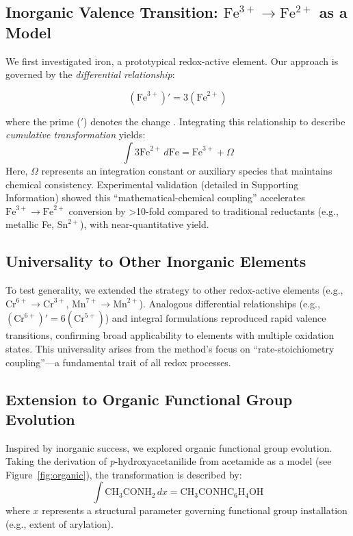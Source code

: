 \documentclass[twocolumn,11pt]{article}
\begin{document}
\subsection{Inorganic Valence Transition: \(\text{Fe}^{3+} \to \text{Fe}^{2+}\) as a Model}
We first investigated iron, a prototypical redox-active element. Our approach is governed by the \emph{differential relationship}:

\begin{equation}
\left( \text{Fe}^{3+} \right)' = 3 \left( \text{Fe}^{2+} \right) 
\end{equation}

where the prime (\('\)) denotes the change . Integrating this relationship to describe \emph{cumulative transformation} yields:
\begin{equation}
\int 3 \text{Fe}^{2+} \, d\text{Fe} = \text{Fe}^{3+} + \Omega
\end{equation}
Here, \(\Omega\) represents an integration constant or auxiliary species that maintains chemical consistency. Experimental validation (detailed in Supporting Information) showed this ``mathematical-chemical coupling'' accelerates \(\text{Fe}^{3+} \to \text{Fe}^{2+}\) conversion by >10-fold compared to traditional reductants (e.g., metallic Fe, \(\text{Sn}^{2+}\)), with near-quantitative yield.

\subsection{Universality to Other Inorganic Elements}
To test generality, we extended the strategy to other redox-active elements (e.g., \(\text{Cr}^{6+} \to \text{Cr}^{3+}\), \(\text{Mn}^{7+} \to \text{Mn}^{2+}\)). Analogous differential relationships (e.g., \(\left( \text{Cr}^{6+} \right)' = 6 \left( \text{Cr}^{5+} \right)\)) and integral formulations reproduced rapid valence transitions, confirming broad applicability to elements with multiple oxidation states. This universality arises from the method’s focus on ``rate-stoichiometry coupling''—a fundamental trait of all redox processes.

\subsection{Extension to Organic Functional Group Evolution}
Inspired by inorganic success, we explored organic functional group evolution. Taking the derivation of \textit{p}-hydroxyacetanilide from acetamide as a model (see Figure~\ref{fig:organic}), the transformation is described by:
\begin{equation}
\int \mathrm{CH_3CONH_2} \, dx = \mathrm{CH_3CONHC_6H_4OH}
\end{equation}
where \(x\) represents a structural parameter governing functional group installation (e.g., extent of arylation).
\end{document}
